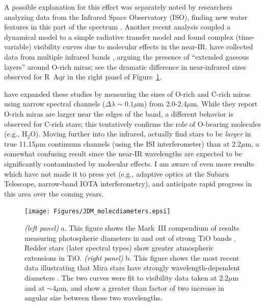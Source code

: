 \documentclass[12pt]{iopart}
\begin{document}
A possible explanation for this effect was separately noted by
researchers analyzing data from the Infrared Space Observatory (ISO),
finding new water features in this part of the spectrum
\citep[e.g.,][]{tsuji1997,matsuura2002}.  Another recent analysis
\citep{jacob2002} coupled a dynamical model to a simple radiative
transfer model and found complex (time-variable) visibility curves due
to molecular effects in the near-IR.  \citet{mennesson2002} have
collected data from multiple infrared bands
\citep[e.g.,][]{chagnon2002}, arguing the presence of ``extended
gaseous layers'' around O-rich miras; see the dramatic difference in
near-infrared sizes observed for R~Aqr in the right panel of
Figure~\ref{atmospheres}.

\citet{thompson2002a} have expanded these studies by measuring the
sizes of O-rich and C-rich miras using narrow spectral channels
($\Delta\lambda\sim 0.1\mu$m) from 2.0-2.4$\mu$m.  While they report
O-rich miras are larger near the edges of the band, a different
behavior is observed for C-rich stars; this tentatively confirms the
role of O-bearing molecules (e.g., H$_2$O).  Moving further into the
infrared, \citet{weiner2000} \citep[following earlier work
by][]{bester1996} actually find stars to be {\em larger} in true
11.15$\mu$m continuum channels (using the ISI interferometer) than at
2.2$\mu$m, a somewhat confusing result since the near-IR wavelengths
are expected to be significantly contaminated by molecular effects.  I
am aware of even more results which have not made it to press yet
(e.g., adaptive optics at the Subaru Telescope, narrow-band IOTA
interferometry), and anticipate rapid progress in this area over the
coming years.

\begin{figure}[tbhp]
\begin{center}
\texttt{[image: Figures/JDM\_molecdiameters.epsi]}
\caption{\footnotesize {\em (left panel)} a. 
  This figure shows the Mark~III compendium of results measuring
  photospheric diameters in and out of strong TiO bands
  \citep[reproduced from Figure~2 of][with permission of the
  AAS]{quirrenbach1993a}. Redder stars (later spectral types) show
  greater atmospheric extensions in TiO.
{\em (right panel)} b. This figure shows the most recent
data illustrating that Mira stars have strongly wavelength-dependent
diameters
\citep[reproduced from Figure~2 of][with permission of the AAS]{mennesson2002}.
The two curves were fit to visibility data taken at 2.2$\mu$m and at
$\sim$4$\mu$m, and show a greater than factor of two increase in
angular size between these two wavelengths.
\label{atmospheres}}
\end{center}
\end{figure}
\end{document}
